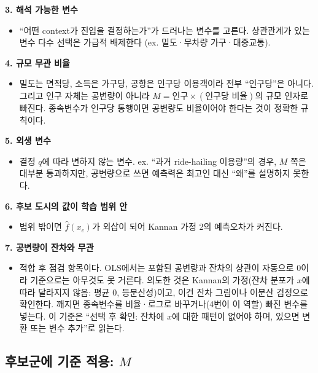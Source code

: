 \documentclass[10pt,a4paper]{article}
\begin{document}
\begin{mdframed}[linecolor=red!60,linewidth=2pt]
\textbf{3. 해석 가능한 변수}
\begin{itemize}[leftmargin=*,itemsep=1pt]
\item ``어떤 context가 진입을 결정하는가''가 드러나는 변수를 고른다. 상관관계가 있는 변수 다수 선택은 가급적 배제한다 (ex. 밀도·무차량 가구·대중교통).
\end{itemize}

\textbf{4. 규모 무관 비율}
\begin{itemize}[leftmargin=*,itemsep=1pt]
\item 밀도는 면적당, 소득은 가구당, 공항은 인구당 이용객이라 전부 ``인구당''은 아니다. 그리고 인구 자체는 공변량이 아니라 $M=\text{인구}\times(\text{인구당 비율})$의 규모 인자로 빠진다. 종속변수가 인구당 통행이면 공변량도 비율이어야 한다는 것이 정확한 규칙이다.
\end{itemize}

\textbf{5. 외생 변수}
\begin{itemize}[leftmargin=*,itemsep=1pt]
\item 결정 $q$에 따라 변하지 않는 변수. ex. ``과거 ride-hailing 이용량''의 경우, $M$ 쪽은 대부분 통과하지만, 공변량으로 쓰면 예측력은 최고인 대신 ``왜''를 설명하지 못한다.
\end{itemize}

\textbf{6. 후보 도시의 값이 학습 범위 안}
\begin{itemize}[leftmargin=*,itemsep=1pt]
\item 범위 밖이면 $\hat f(x_c)$가 외삽이 되어 Kannan 가정 2의 예측오차가 커진다.
\end{itemize}

\textbf{7. 공변량이 잔차와 무관}
\begin{itemize}[leftmargin=*,itemsep=1pt]
\item 적합 후 점검 항목이다. OLS에서는 포함된 공변량과 잔차의 상관이 자동으로 0이라 기준으로는 아무것도 못 거른다. 의도한 것은 Kannan의 가정(잔차 분포가 $x$에 따라 달라지지 않음: 평균 0, 등분산성)이고, 이건 잔차 그림이나 이분산 검정으로 확인한다. 깨지면 종속변수를 비율·로그로 바꾸거나(4번이 이 역할) 빠진 변수를 넣는다. 이 기준은 ``선택 후 확인: 잔차에 $x$에 대한 패턴이 없어야 하며, 있으면 변환 또는 변수 추가''로 읽는다.
\end{itemize}

\subsection{후보군에 기준 적용: $M$}


\end{mdframed}
\end{document}
